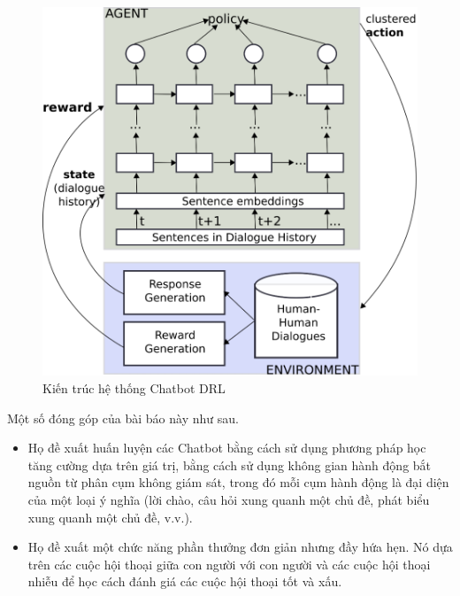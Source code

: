 \begin{center}
    \begin{figure}[ht!]
        \begin{center}
         \includegraphics[scale=0.9]{chapter2/img/clusterarch.png}
        \end{center}
        \caption{Kiến trúc hệ thống Chatbot DRL}
        \label{fig:clusterarch}
    \end{figure}
\end{center}

Một số đóng góp của bài báo này như sau.

\begin{itemize}
    \item Họ đề xuất huấn luyện các Chatbot bằng cách sử dụng phương pháp học tăng cường dựa trên giá trị, bằng cách sử dụng không gian hành động bắt nguồn từ phân cụm không giám sát, trong đó mỗi cụm hành động là đại diện của một loại ý nghĩa (lời chào, câu hỏi xung quanh một chủ đề, phát biểu xung quanh một chủ đề, v.v.).
    \item Họ đề xuất một chức năng phần thưởng đơn giản nhưng đầy hứa hẹn. Nó dựa trên các cuộc hội thoại giữa con người với con người và các cuộc hội thoại nhiễu để học cách đánh giá các cuộc hội thoại tốt và xấu.
\end{itemize}

